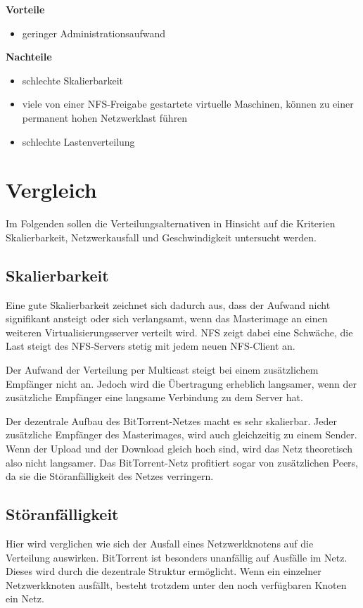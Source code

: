 
\textbf{Vorteile}
\begin{itemize}
 \item geringer Administrationsaufwand
\end{itemize}

\textbf{Nachteile}
\begin{itemize}
 \item schlechte Skalierbarkeit
 \item viele von einer NFS-Freigabe gestartete virtuelle Maschinen, können zu einer permanent hohen Netzwerklast führen
 \item schlechte Lastenverteilung
\end{itemize}

\section{Vergleich}
Im Folgenden sollen die Verteilungsalternativen in Hinsicht auf die Kriterien Skalierbarkeit, Netzwerkausfall und Geschwindigkeit untersucht werden.

\subsection{Skalierbarkeit}
Eine gute Skalierbarkeit zeichnet sich dadurch aus, dass der Aufwand nicht signifikant ansteigt oder sich verlangsamt, wenn das Masterimage an einen weiteren Virtualisierungsserver verteilt wird. NFS zeigt dabei eine Schwäche, die Last steigt des NFS-Servers stetig mit jedem neuen NFS-Client an. 

Der Aufwand der Verteilung per Multicast steigt bei einem zusätzlichem Empfänger nicht an. Jedoch wird die Übertragung erheblich langsamer, wenn der zusätzliche Empfänger eine langsame Verbindung zu dem Server hat. 

Der dezentrale Aufbau des BitTorrent-Netzes macht es sehr skalierbar. Jeder zusätzliche Empfänger des Masterimages, wird auch gleichzeitig zu einem Sender. Wenn der Upload und der Download gleich hoch sind, wird das Netz theoretisch also nicht langsamer. Das BitTorrent-Netz profitiert sogar von zusätzlichen Peers, da sie die Störanfälligkeit des Netzes verringern.

\subsection{Störanfälligkeit}
Hier wird verglichen wie sich der Ausfall eines Netzwerkknotens auf die Verteilung auswirken. BitTorrent ist besonders unanfällig auf Ausfälle im Netz. Dieses wird durch die dezentrale Struktur ermöglicht. Wenn ein einzelner Netzwerkknoten ausfällt, besteht trotzdem unter den noch verfügbaren Knoten ein Netz. 

